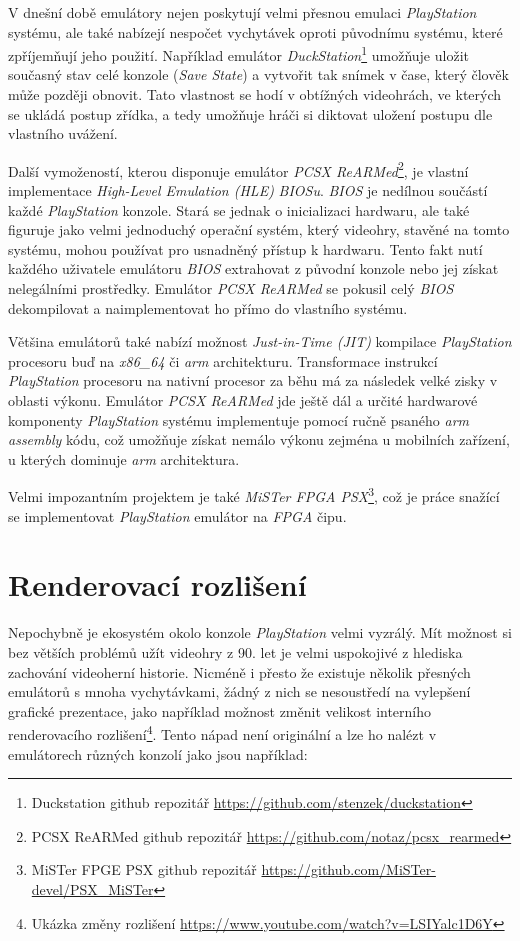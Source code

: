 V dnešní době emulátory nejen poskytují velmi přesnou emulaci \textit{PlayStation} systému, 
ale také nabízejí nespočet vychytávek oproti původnímu systému, které zpříjemňují jeho použití.
Například emulátor \textit{DuckStation}\footnote{Duckstation github repozitář \url{https://github.com/stenzek/duckstation}} umožňuje uložit současný stav celé konzole (\textit{Save State}) 
a vytvořit tak snímek v čase, který člověk může později obnovit. 
Tato vlastnost se hodí v obtížných videohrách, ve kterých se ukládá postup zřídka, 
a tedy umožňuje hráči si diktovat uložení postupu dle vlastního uvážení.

Další vymožeností, kterou disponuje emulátor \textit{PCSX ReARMed}\footnote{PCSX ReARMed github repozitář \url{https://github.com/notaz/pcsx_rearmed}}, 
je vlastní implementace \textit{High-Level Emulation (HLE)} \textit{BIOSu}. 
\textit{BIOS} je nedílnou součástí každé \textit{PlayStation} konzole. Stará se jednak o inicializaci hardwaru, 
ale také figuruje jako velmi jednoduchý operační systém, který videohry, stavěné na tomto systému, 
mohou používat pro usnadněný přístup k hardwaru. Tento fakt nutí každého uživatele emulátoru 
\textit{BIOS} extrahovat z původní konzole nebo jej získat nelegálními prostředky. 
Emulátor \textit{PCSX ReARMed} se pokusil celý \textit{BIOS} dekompilovat a naimplementovat ho přímo do vlastního systému.

Většina emulátorů také nabízí možnost \textit{Just-in-Time (JIT)} kompilace \textit{PlayStation} 
procesoru buď na \textit{x86\_64} či \textit{arm} architekturu. Transformace instrukcí \textit{PlayStation} 
procesoru na nativní procesor za běhu má za následek velké zisky v oblasti výkonu. Emulátor \textit{PCSX ReARMed} 
jde ještě dál a určité hardwarové komponenty \textit{PlayStation} systému implementuje pomocí ručně 
psaného \textit{arm assembly} kódu, což umožňuje získat nemálo výkonu zejména u mobilních zařízení, u kterých dominuje \textit{arm} architektura.

Velmi impozantním projektem je také \textit{MiSTer FPGA PSX}\footnote{MiSTer FPGE PSX github repozitář \url{https://github.com/MiSTer-devel/PSX_MiSTer}}, 
což je práce snažící se implementovat \textit{PlayStation} emulátor na \textit{FPGA} čipu.

\section{Renderovací rozlišení}

Nepochybně je ekosystém okolo konzole \textit{PlayStation} velmi vyzrálý. 
Mít možnost si bez větších problémů užít videohry z 90. let je velmi uspokojivé z hlediska zachování videoherní historie. 
Nicméně i přesto že existuje několik přesných emulátorů s mnoha vychytávkami, 
žádný z nich se nesoustředí na vylepšení grafické prezentace, jako například možnost 
změnit velikost interního renderovacího rozlišení\footnote{Ukázka změny rozlišení \url{https://www.youtube.com/watch?v=LSIYalc1D6Y}}. Tento nápad není originální a lze ho nalézt v emulátorech různých konzolí jako jsou například:

